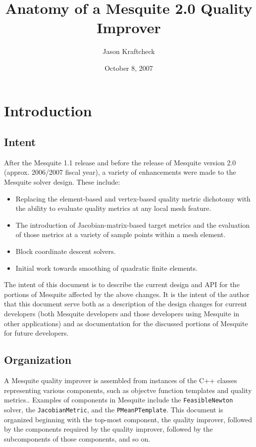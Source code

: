 \documentclass{article}
\author{Jason Kraftcheck}
\title{Anatomy of a Mesquite 2.0 Quality Improver}
\date{October 8, 2007}
\begin{document}
\maketitle
\tableofcontents
\listoffigures



\newenvironment{smallmargins}{\addtolength{\hoffset}{-1.0in}\addtolength{\textwidth}{2.0in} }{}

\section{Introduction}

\subsection{Intent}

After the Mesquite 1.1 release and before the release of Mesquite version 2.0 (approx. 2006/2007 fiscal year), a variety of enhancements were made to the Mesquite solver design.  These include:
\begin{itemize}
\item Replacing the element-based and vertex-based quality metric dichotomy with the ability to evaluate quality metrics at any local mesh feature.
\item The introduction of Jacobian-matrix-based target metrics and the evaluation of those metrics at a variety of sample points within a mesh element.
\item Block coordinate descent solvers.
\item Initial work towards smoothing of quadratic finite elements.
\end{itemize}

The intent of this document is to describe the current design and API for the portions of Mesquite affected by the above changes.  It is the intent of the
author that this document serve both as a description of the design changes
for current developers (both Mesquite developers and those developers using Mesquite in other applications) and as documentation for the discussed portions of Mesquite for future developers.

\subsection{Organization}

A Mesquite quality improver is assembled from instances of the C++ classes representing various components, such as objectve function templates and quality metrics..  Examples of components in Mesquite include the \texttt{FeasibleNewton} solver, the \texttt{JacobianMetric}, and the \texttt{PMeanPTemplate}.  This document is organized beginning with the top-most component, the quality improver, followed by the components required by the quality improver, followed by the subcomponents of those components, and so on.
\end{document}
